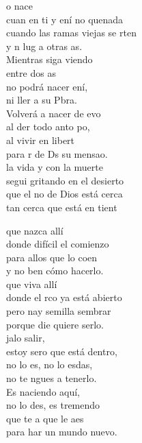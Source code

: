 \begin{cancion}%
	o nace \\
	cuan en ti y ení no quenada\\
	cuando las ramas viejas se rten\\
	y n lug a otras as.\\
	\jump
	Mientras siga viendo    \\
	entre dos as \\
	no podrá nacer ení,\\
	ni ller a  su Pbra.\\
	\jump
	Volverá a nacer de evo\\
	al der todo anto po, \\
	al vivir en libert \\
	para r de Ds su mensao.\\
	\jump
	 la vida y con la muerte\\
	segui gritando en el desierto \\
	que el no de Dios está cerca\\
	tan cerca que está en tient \jump\\
	\begin{chorus}%
		 que nazca allí\\
		donde  difícil el comienzo\\
		para allos que lo coen\\
		y no ben cómo hacerlo.\\
	\jump
		 que viva allí\\
		donde el rco ya está abierto\\
		pero nay semilla  sembrar\\
		porque die quiere serlo.\\
	\jump
		jalo salir,\\
		estoy sero que está dentro,\\
		no lo es, no lo esdas,\\
		no te ngues a tenerlo.\\
	\jump
		Es naciendo aquí,\\
		no lo des, es tremendo\\
		que te a que le aes\\
		para har un mundo nuevo.\jump\\
	\end{chorus}%
\end{cancion}%
